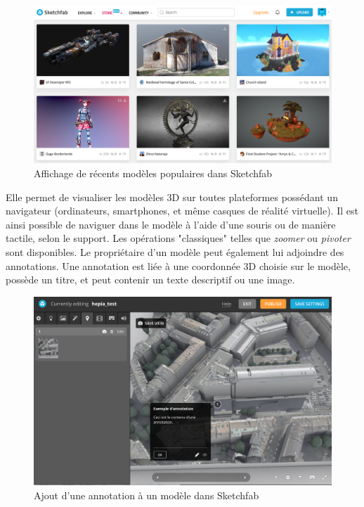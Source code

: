 \begin{figure}
    \centering
    \includegraphics[width=\linewidth]{Figures/sketchfab-overview.png}
    \caption{Affichage de récents modèles populaires dans Sketchfab}
    \label{fig:sketchfab-overview}
\end{figure}

Elle permet de visualiser les modèles 3D sur toutes plateformes possédant un navigateur (ordinateurs, smartphones, et même casques de réalité virtuelle).
Il est ainsi possible de naviguer dans le modèle à l'aide d'une souris ou de manière tactile, selon le support. Les opérations "classiques" telles que \textit{zoomer} ou \textit{pivoter} sont disponibles.
Le propriétaire d'un modèle peut également lui adjoindre des annotations. Une annotation est liée à une coordonnée 3D choisie sur le modèle, possède un titre, et peut contenir un texte descriptif ou une image.

\begin{figure}[h]
    \centering
    \includegraphics[width=\linewidth]{Figures/sketchfab-annotation-example.png}
    \caption{Ajout d'une annotation à un modèle dans Sketchfab}
    \label{fig:sketchfab-annotation-example}
\end{figure}

